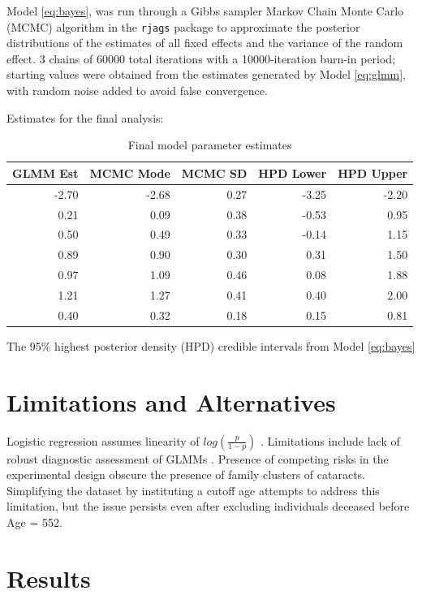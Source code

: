 \documentclass[12pt]{article}
\begin{document}
Model \eqref{eq:bayes}, was run through a Gibbs sampler Markov Chain Monte Carlo (MCMC) algorithm in the \texttt{rjags} package \citep{R-rjags} to approximate the posterior distributions of the estimates of all fixed effects and the variance of the random effect. 3 chains of 60000 total iterations with a 10000-iteration burn-in period; starting values were obtained from the estimates generated by Model \eqref{eq:glmm}, with random noise added to avoid false convergence.

Estimates for the final analysis:

\begin{table}[H]
\centering
\begin{tabular}{rrrrr}
  \toprule
GLMM Est & MCMC Mode & MCMC SD & HPD Lower & HPD Upper \\ 
  \midrule
-2.70 & -2.68 & 0.27 & -3.25 & -2.20 \\ 
  0.21 & 0.09 & 0.38 & -0.53 & 0.95 \\ 
  0.50 & 0.49 & 0.33 & -0.14 & 1.15 \\ 
  0.89 & 0.90 & 0.30 & 0.31 & 1.50 \\ 
  0.97 & 1.09 & 0.46 & 0.08 & 1.88 \\ 
  1.21 & 1.27 & 0.41 & 0.40 & 2.00 \\ 
  0.40 & 0.32 & 0.18 & 0.15 & 0.81 \\ 
   \bottomrule
\end{tabular}
\caption{Final model parameter estimates} 
\end{table}

The 95\% highest posterior density (HPD) credible intervals from Model \eqref{eq:bayes}

\section{Limitations and Alternatives}
\label{sec:limits}

Logistic regression assumes linearity of \(log(\frac{p}{1-p})\) \citep{BMLR2021}.
Limitations include lack of robust diagnostic assessment of GLMMs \citep{CDA}.
Presence of competing risks in the experimental design obscure the presence of family clusters of cataracts. Simplifying the dataset by instituting a cutoff age attempts to address this limitation, but the issue persists even after excluding individuals deceased before Age = 552.

\section{Results}
\label{sec:results}
\end{document}
